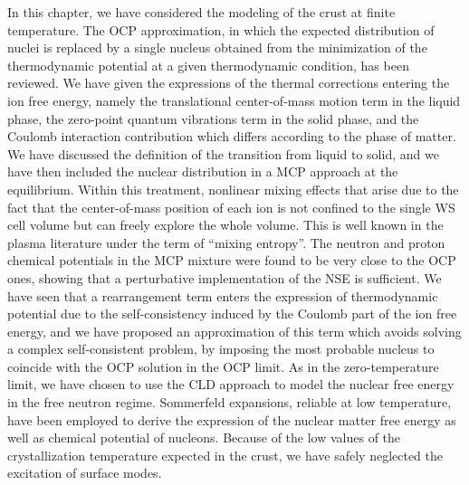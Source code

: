 In this chapter, we have considered the modeling of the crust at finite
temperature. 
The OCP approximation, in which the expected distribution of
nuclei is replaced by a single nucleus obtained from the minimization of the
thermodynamic potential at a given thermodynamic condition, has been reviewed.
We have given the expressions of the thermal corrections entering the ion 
free energy, namely the translational center-of-mass motion term in the liquid 
phase, the zero-point quantum vibrations term in the solid phase, and the 
Coulomb interaction contribution which differs according to the phase of 
matter. We have discussed the definition of the transition from liquid to
solid, and we have then included the nuclear distribution in a MCP approach at 
the equilibrium. 
Within this treatment, nonlinear mixing effects that arise due to 
the fact that the center-of-mass position of each ion is not confined to the 
single WS cell volume but can freely explore the whole volume. This is well
known in the plasma literature under the term of ``mixing entropy''.
The neutron and proton chemical potentials in the MCP mixture were found to be 
very close to the OCP ones, showing that a perturbative implementation of the 
NSE is sufficient. 
We have seen that a rearrangement term enters the expression of thermodynamic 
potential due to the self-consistency induced by the Coulomb part of the ion 
free energy, and we have proposed an approximation of this term which avoids
solving a complex self-consistent problem, by imposing the most 
probable nucleus to coincide with the OCP solution in the OCP limit.
As in the zero-temperature limit, we have chosen to use the CLD approach to 
model the nuclear free energy in the free neutron regime. 
Sommerfeld expansions, reliable at low temperature, have been employed to 
derive the expression of the nuclear matter free energy as well as chemical
potential of nucleons. Because of the low values of the crystallization 
temperature expected in the crust, we have safely neglected the excitation of 
surface modes.


